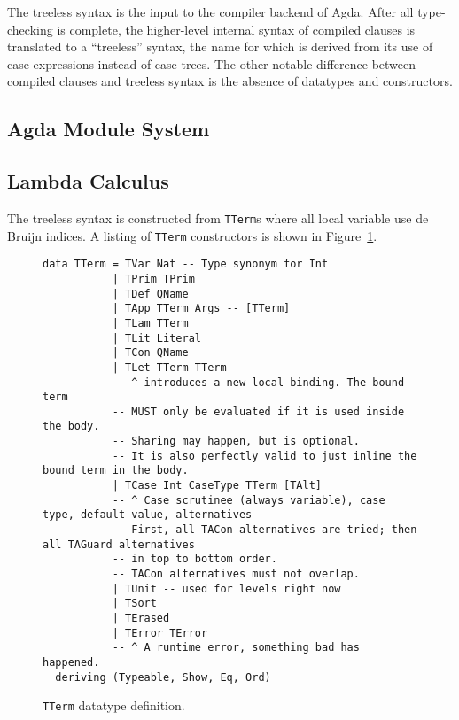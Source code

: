 The treeless syntax is the input to the compiler backend of Agda. After all type-checking is complete, the higher-level internal syntax of compiled clauses is translated to a ``treeless'' syntax, the name for which is derived from its use of case expressions instead of case trees. The other notable difference between compiled clauses and treeless syntax is the absence of datatypes and constructors.\cite{agdahackage} %

\subsection{Agda Module System}

\subsection{Lambda Calculus}

The treeless syntax is constructed from \lstinline{TTerm}s %
where all local variable use de Bruijn indices. A listing of \lstinline{TTerm} constructors is shown in Figure~\ref{code:TTerm}.



\begin{figure}
\begin{lstlisting}[style=blockhaskell]
data TTerm = TVar Nat -- Type synonym for Int
           | TPrim TPrim
           | TDef QName
           | TApp TTerm Args -- [TTerm]
           | TLam TTerm
           | TLit Literal
           | TCon QName
           | TLet TTerm TTerm
           -- ^ introduces a new local binding. The bound term
           -- MUST only be evaluated if it is used inside the body.
           -- Sharing may happen, but is optional.
           -- It is also perfectly valid to just inline the bound term in the body.
           | TCase Int CaseType TTerm [TAlt]
           -- ^ Case scrutinee (always variable), case type, default value, alternatives
           -- First, all TACon alternatives are tried; then all TAGuard alternatives
           -- in top to bottom order.
           -- TACon alternatives must not overlap.
           | TUnit -- used for levels right now
           | TSort
           | TErased
           | TError TError
           -- ^ A runtime error, something bad has happened.
  deriving (Typeable, Show, Eq, Ord)
\end{lstlisting}
\caption{\lstinline{TTerm} datatype definition.}
\label{code:TTerm}
\end{figure}

